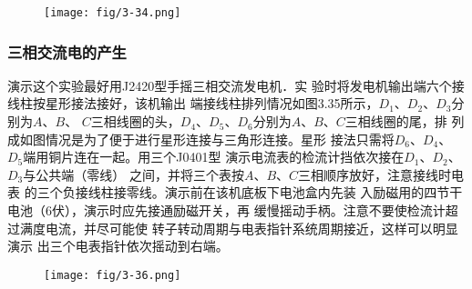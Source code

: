 \begin{figure}[htp]
    \centering
\texttt{[image: fig/3-34.png]}
    \caption{}
\end{figure}

\subsubsection{三相交流电的产生}

\begin{figure}[htp]
    \centering
{}
    \caption{}
\end{figure}

演示这个实验最好用J2420型手摇三相交流发电机．实
验时将发电机输出端六个接线柱按星形接法接好，该机输出
端接线柱排列情况如图3.35所示，$D_1$、$D_2$、$D_3$分别为$A$、$B$、
$C$三相线圈的头，$D_4$、$D_5$、$D_6$分别为$A$、$B$、$C$三相线圈的尾，排
列成如图情况是为了便于进行星形连接与三角形连接。星形
接法只需将$D_6$、$D_4$、$D_5$端用铜片连在一起。用三个J0401型
演示电流表的检流计挡依次接在$D_1$、$D_2$、$D_3$与公共端（零线）
之间，并将三个表按$A$、$B$、$C$三相顺序放好，注意接线时电表
的三个负接线柱接零线。演示前在该机底板下电池盒内先装
入励磁用的四节干电池（6伏），演示时应先接通励磁开关，再
缓慢摇动手柄。注意不要使检流计超过满度电流，并尽可能使
转子转动周期与电表指针系统周期接近，这样可以明显演示
出三个电表指针依次摇动到右端。

\begin{figure}[htp]
    \centering
\texttt{[image: fig/3-36.png]}
    \caption{}
\end{figure}

